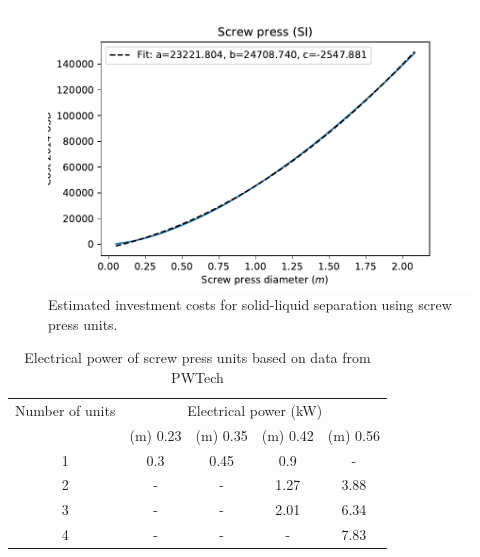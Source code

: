 \documentclass[10pt,a4paper]{article}
\begin{document}
\begin{figure}[H]
	\centering
	\includegraphics[width=0.6\linewidth]{screwpress_cost_m} 
	\caption{Estimated investment costs for solid-liquid separation using screw press units.}
	\label{fig:screwpress_investment_costs}
%	
\end{figure}

\begin{table}[H] 
	\begin{adjustwidth}{}{}
		\centering
		\caption{Electrical power of screw press units based on data from PWTech \cite{PWTech}} \label{table:ScrewPress_power}
		\begin{tabular}{c c c c c}
			\toprule
			\multicolumn{1}{c}{Number of units } &\multicolumn{4}{c}{Electrical power (kW)}\\
			\cmidrule(lr){2-5}
			&\diameter(m) 0.23 & \diameter(m) 0.35 & \diameter(m) 0.42 & \diameter(m) 0.56	\\ \midrule
			1 		& \cellcolor{blue!25}0.3 & \cellcolor{blue!25}0.45 & \cellcolor{blue!25}0.9 & -	\\
			2 	& -						& - 	& \cellcolor{blue!25}1.27 & \cellcolor{blue!25}3.88 	\\
			3	& -						& - 					& \cellcolor{blue!25}2.01 & \cellcolor{blue!25}6.34 	\\
			4 	& -						& - 					& - & \cellcolor{blue!25}7.83 \\
		\end{tabular}
	\end{adjustwidth}
\end{table}
\end{document}
